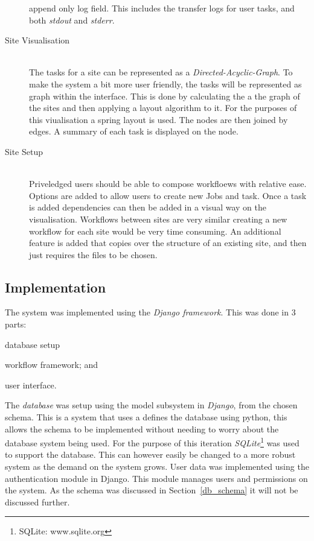 \documentclass[12pt,a4paper]{report}
\begin{document}
\begin{description}
        append only log field. This includes the transfer logs for user tasks, and both
        \emph{stdout} and \emph{stderr}.
    \item[Site Visualisation] \hfill \\
        The tasks for a site can be represented as a \emph{Directed-Acyclic-Graph}. To
        make the system a bit more user friendly, the tasks will be represented as
        graph within the interface. This is done by calculating the a the graph of
        the sites and then applying a layout algorithm to it. For the purposes of this
        viualisation a spring layout is used. The nodes are then joined by edges. A
        summary of each task is displayed on the node.
    \item[Site Setup] \hfill \\
        Priveledged users should be able to compose workfloews with relative ease. Options
        are added to allow users to create new Jobs and task. Once a task is added dependencies
        can then be added in a visual way on the visualisation. Workflows between sites are very similar
        creating a new workflow for each site would be very time consuming. An additional
        feature is added that copies over the structure of an existing site, and then
        just requires the files to be chosen.
\end{description}

\subsection{Implementation\label{iter2_impl}}

The system was implemented using the \emph{Django framework}. This was done in 3 parts:
\begin{inparaenum}
\item database setup
\item workflow framework; and
\item user interface.
\end{inparaenum}

The \emph{database} was setup using the model subsystem in \emph{Django}, from the chosen schema.
This is a system that uses a defines the database using python, this allows the schema
to be implemented without needing to worry about the database system being used. For the
purpose of this iteration \emph{SQLite}\footnote{SQLite: www.sqlite.org} was used to
support the database. This can however easily be changed to a more robust system as the demand
on the system grows. User data was implemented using the authentication module in Django. This
module manages users and permissions on the system. As the schema was discussed in Section~\ref{db_schema}
it will not be discussed further.
\end{document}
